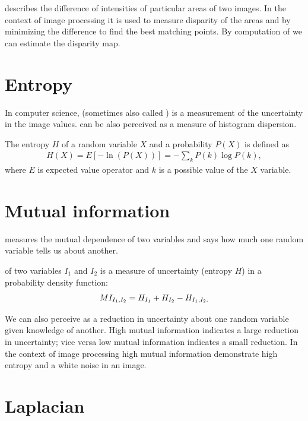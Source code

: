  describes the difference of intensities of particular areas of two images.
In the context of image processing it is used to measure disparity of the areas and by minimizing the difference to find the best matching points.
By computation of  we can estimate the disparity map.

\section{Entropy}

In computer science,  (sometimes also called ) is a measurement of the uncertainty in the image values.
 can be also perceived as a measure of histogram dispersion.


\begin{definition}
The entropy $H$ of a random variable $X$ and a probability $P(X)$ is defined as
\begin{align*}
  H(X) = E[-\ln(P(X))] = - \sum_k{P(k)\log P(k)},
\end{align*}
where $E$ is expected value operator and $k$ is a possible value of the $X$ variable.
\end{definition}

\section{Mutual information}

 measures the mutual dependence of two variables and says how much one random variable tells us about another.
\begin{definition}
 of two variables $I_1$ and $I_2$ is a measure of uncertainty (entropy $H$) in a probability density function:
\begin{align*}
\MI{I_1, I_2} = \H{I_1} + \H{I_2} - \H{I_1, I_2}.
\end{align*}  
\end{definition}
We can also perceive  as a reduction in uncertainty about one random variable given knowledge of another.
High mutual information indicates a large reduction in uncertainty; vice versa low mutual information indicates a small reduction.
In the context of image processing high mutual information demonstrate high entropy and a white noise in an image.


\section{Laplacian}

